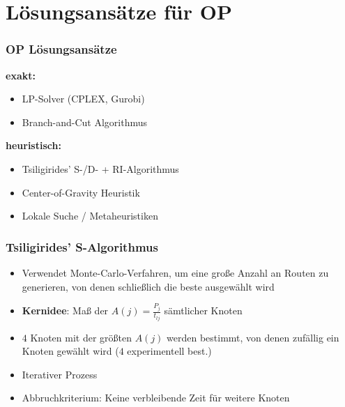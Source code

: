 \documentclass{beamer}
\begin{document}
\section{Lösungsansätze für \textsc{OP}}

\begin{frame}
  \frametitle{OP Lösungsansätze}
  \textbf{exakt:}
  \begin{itemize}
    \item LP-Solver (CPLEX, Gurobi)
    \item Branch-and-Cut Algorithmus
  \end{itemize}
  \textbf{heuristisch:}
  \begin{itemize}
    \item Tsiligirides' S-/D- + RI-Algorithmus
    \item Center-of-Gravity Heuristik
    \item Lokale Suche / Metaheuristiken
  \end{itemize}
\end{frame}

\begin{frame}
  \frametitle{Tsiligirides' S-Algorithmus}
  \begin{itemize}
    \item Verwendet Monte-Carlo-Verfahren, um eine große Anzahl an Routen zu generieren,
    von denen schließlich die beste ausgewählt wird
    \item \textbf{Kernidee}: Maß der  $A(j) = \frac{P_j}{t_{lj}}$ sämtlicher Knoten
    \item $4$ Knoten mit der größten $A(j)$ werden bestimmt, von denen zufällig ein Knoten gewählt wird ($4$ experimentell best.)
    \item Iterativer Prozess
    \item Abbruchkriterium: Keine verbleibende Zeit für weitere Knoten
  \end{itemize}
\end{frame}
\end{document}
